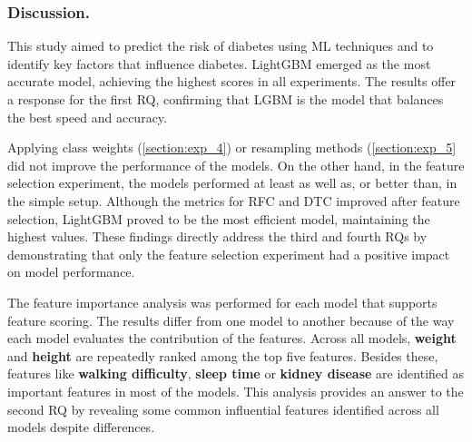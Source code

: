 \documentclass[runningheads]{llncs}
\begin{document}
\subsubsection{Discussion.}
This study aimed to predict the risk of diabetes using ML techniques and to identify key factors that influence diabetes. LightGBM emerged as the most accurate model, achieving the highest scores in all experiments. The results offer a response for the first RQ, confirming that LGBM is the model that balances the best speed and accuracy. 

Applying class weights (\autoref{section:exp_4}) or resampling methods (\autoref{section:exp_5} did not improve the performance of the models. On the other hand, in the feature selection experiment, the models performed at least as well as, or better than, in the simple setup. Although the metrics for RFC and DTC improved after feature selection, LightGBM proved to be the most efficient model, maintaining the highest values. These findings directly address the third and fourth RQs by demonstrating that only the feature selection experiment had a positive impact on model performance.

The feature importance analysis was performed for each model that supports feature scoring. The results differ from one model to another because of the way each model evaluates the contribution of the features. Across all models, \textbf{weight} and \textbf{height} are repeatedly ranked among the top five features. Besides these, features like \textbf{walking difficulty}, \textbf{sleep time} or \textbf{kidney disease} are identified as important features in most of the models. This analysis provides an answer to the second RQ by revealing some common influential features identified across all models despite differences. 
\end{document}
